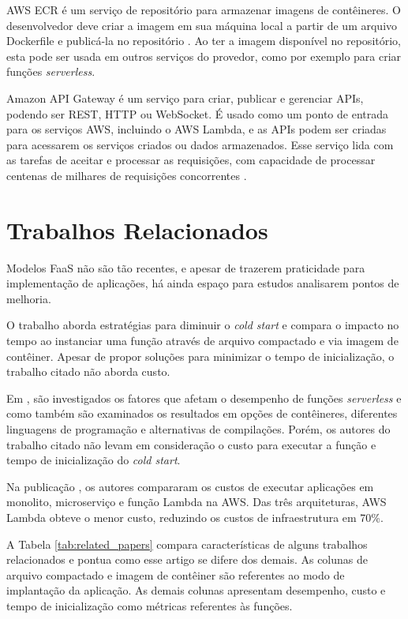 \documentclass[conference]{IEEEtran}
\begin{document}
AWS ECR é um serviço de repositório para armazenar imagens de contêineres. O desenvolvedor deve criar a imagem em sua máquina local a partir de um arquivo Dockerfile e publicá-la no repositório \cite{aws_2023_aws_ecr}. Ao ter a imagem disponível no repositório, esta pode ser usada em outros serviços do provedor, como por exemplo para criar funções \textit{serverless}.

Amazon API Gateway é um serviço para criar, publicar e gerenciar APIs, podendo ser REST, HTTP ou WebSocket. É usado como um ponto de entrada para os serviços AWS, incluindo o AWS Lambda, e as APIs podem ser criadas para acessarem os serviços criados ou dados armazenados. Esse serviço lida com as tarefas de aceitar e processar as requisições, com capacidade de processar centenas de milhares de requisições concorrentes \cite{aws_2023_what_is_api_gateway}. 

\section{Trabalhos Relacionados}
\label{sec:TrabRel}

Modelos FaaS não são tão recentes, e apesar de trazerem praticidade para implementação de aplicações, há ainda espaço para estudos analisarem pontos de melhoria.

O trabalho \cite{dantas_2022_reducing_cold_start} aborda estratégias para diminuir o \textit{cold start} e compara o impacto no tempo ao instanciar uma função através de arquivo compactado e via imagem de contêiner. Apesar de propor soluções para minimizar o tempo de inicialização, o trabalho citado não aborda custo.

Em \cite{Elsakhawy_2021_performance_analysis_serverless}, são investigados os fatores que afetam o desempenho de funções \textit{serverless} e como também são examinados os resultados em opções de contêineres, diferentes linguagens de programação e alternativas de compilações. Porém, os autores do trabalho citado não levam em consideração o custo para executar a função e tempo de inicialização do \textit{cold start}.

Na publicação \cite{Villamizar_2017_cost_comparison_lambda}, os autores compararam os custos de executar aplicações em monolito, microserviço e função Lambda na AWS. Das três arquiteturas, AWS Lambda obteve o menor custo, reduzindo os custos de infraestrutura em 70\%.

A Tabela \ref{tab:related_papers} compara características de alguns trabalhos relacionados e pontua como esse artigo se difere dos demais. As colunas de arquivo compactado e imagem de contêiner são referentes ao modo de implantação da aplicação. As demais colunas apresentam desempenho, custo e tempo de inicialização como métricas referentes às funções.
\end{document}
